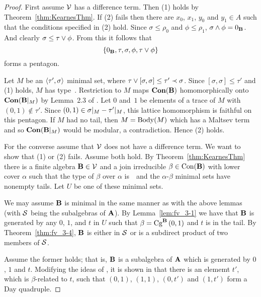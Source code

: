 \begin{proof}
First assume $\sV$ has a difference term.
Then (1) holds by Theorem~\ref{thm:KearnesThm}.
If (2) fails then there are $x_0$, $x_1$, $y_0$ and $y_1 \in A$ such
that the conditions specified in (2) hold. 
Since $\sigma \le \rho_0$ and 
$\phi \le \rho_1$, $\sigma \meet \phi = 0_{\alg B}$. And clearly
$\sigma \le \tau \join \phi$.
From this it follows that 
\[
\{0_{\alg B}, \tau, \sigma, \phi, \tau \join \phi\}
\]
forms a pentagon.

Let $M$ be an $\la \tau',\sigma\ra$ minimal set, 
where $\tau \join [\sigma,\sigma] \le \tau' \cov \sigma$. 
Since $[\sigma,\sigma] \le \tau'$
and (1) holds, $M$ has type~\atyp.
Restriction to $M$ maps  $\Con (\alg B)$ homomorphically 
onto $\Con (\alg B|_M)$ by Lemma~2.3 of \cite{HM:1988}. 
Let $0$ and~$1$ be elements of a trace of $M$ with 
$(0,1) \notin \tau'$. 
Since $(0,1) \in \sigma|_M\mysetminus \tau'|_M$, this 
lattice homomorphism is faithful on this pentagon. If 
$M$ had no tail, then $M = \body(M)$ which has a Maltsev
term and so $\Con(\alg B|_M)$ would be modular, a contradiction.
Hence (2) holds.


For the converse assume that $\sV$ does not have a difference 
term. 
We want to show that (1) or (2) fails. Assume both hold.
By Theorem~\ref{thm:KearnesThm} there is a finite 
algebra $\alg B \in \sV$ and a join irreducible 
$\beta \in \op{Con}(\alg B)$ with lower cover 
$\alpha$ such that the type of $\beta$ over $\alpha$ is~\atyp\
and the $\alpha$-$\beta$ minimal sets have
nonempty tails. Let $U$ be one of these minimal sets.


We may assume $\alg B$ is minimal in the same manner as with the
above lemmas (with $\sS$ being the subalgebras of $\alg A$).
By Lemma~\ref{lem:fv_3-1} 
we have that $\alg B$ is generated by any $0$, $1$, and $t$ in
$U$ such
that $\beta = \Cga 01{B}$ and $t$ is in the tail. By 
Theorem~\ref{thm:fv_3-4}, $\alg B$ is either 
in $\sS$ or is a subdirect product of two members of $\sS$.

Assume the former holds; that is, $\alg B$ is a subalgebra
of $\alg A$ which is generated by $0$, $1$ and $t$. Modifying 
the ideas of \cite{KearnesKiss1999}, it is shown in
\cite{Freese:2009} that there is an elememt $t'$, which
is $\beta$-related to $t$, such that
$(0,1)$, $(1,1)$, $(0,t')$ and $(1,t')$ form a Day
quadruple.


\end{proof}
